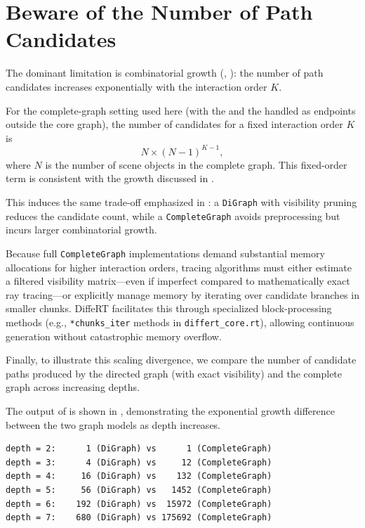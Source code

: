 \section{Beware of the Number of Path Candidates}

The dominant limitation is combinatorial growth (, ): the number of path candidates increases exponentially with the interaction order $K$.

For the complete-graph setting used here (with the  and the  handled as endpoints outside the core graph), the number of candidates for a fixed interaction order $K$ is
\begin{equation}
  N \times (N-1)^{K-1},
\end{equation}
where $N$ is the number of scene objects in the complete graph. This fixed-order term is consistent with the growth discussed in .

This induces the same trade-off emphasized in : a \texttt{DiGraph} with visibility pruning reduces the candidate count, while a \texttt{CompleteGraph} avoids preprocessing but incurs larger combinatorial growth.

Because full \texttt{CompleteGraph} implementations demand substantial memory allocations for higher interaction orders, tracing algorithms must either estimate a filtered visibility matrix---even if imperfect compared to mathematically exact ray tracing---or explicitly manage memory by iterating over candidate branches in smaller chunks. DiffeRT facilitates this through specialized block-processing methods (e.g., \texttt{*chunks\_iter} methods in \texttt{differt\_core.rt}), allowing continuous generation without catastrophic memory overflow.

Finally, to illustrate this scaling divergence, we compare the number of candidate paths produced by the directed graph (with exact visibility) and the complete graph across increasing depths.

\begin{listing*}[htpb]
  \caption{Comparing candidate counts between \texttt{DiGraph} and \texttt{CompleteGraph}.}
\end{listing*}

The output of  is shown in , demonstrating the exponential growth difference between the two graph models as depth increases.
\begin{listing*}[htpb]
  \caption{Output of .}
\begin{verbatim}
depth = 2:      1 (DiGraph) vs      1 (CompleteGraph)
depth = 3:      4 (DiGraph) vs     12 (CompleteGraph)
depth = 4:     16 (DiGraph) vs    132 (CompleteGraph)
depth = 5:     56 (DiGraph) vs   1452 (CompleteGraph)
depth = 6:    192 (DiGraph) vs  15972 (CompleteGraph)
depth = 7:    680 (DiGraph) vs 175692 (CompleteGraph)
\end{verbatim}
\end{listing*}
